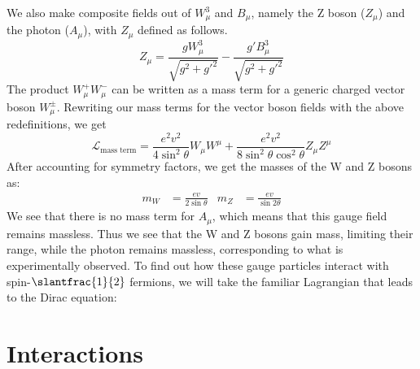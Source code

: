 We also make composite fields out of $W_\mu^3$ and $B_\mu$, namely the Z boson ($Z_\mu$) and the photon ($A_\mu$), with $Z_\mu$ defined as follows.
\[Z_\mu = \frac{gW_\mu^3}{\sqrt{g^2+g'^2}}-\frac{g'B_\mu^3}{\sqrt{g^2+g'^2}}\]
The product $W_\mu^+W_\mu^-$ can be written as a mass term for a generic charged vector boson $W_\mu^\pm$. Rewriting our mass terms for the vector boson fields with the above redefinitions, we get
\[\mathcal{L}_{\text{mass term}}=\frac{e^2v^2}{4\sin^2\theta}W_\mu W^\mu+
\frac{e^2v^2}{8\sin^2\theta\cos^2\theta}Z_\mu Z^\mu\]
After accounting for symmetry factors, we get the masses of the W and Z bosons as:
\begin{align*}
  m_W &=\frac{ev}{2\sin\theta} & 
  m_Z &=\frac{ev}{\sin2\theta}
\end{align*}
We see that there is no mass term for $A_\mu$, which means that this gauge field remains massless. Thus we see that the W and Z bosons gain mass, limiting their range, while the photon remains massless, corresponding to what is experimentally observed. To find out how these gauge particles interact with spin-$\slantfrac{1}{2}$ fermions, we will take the familiar Lagrangian that leads to the Dirac equation:

\section{Interactions}

